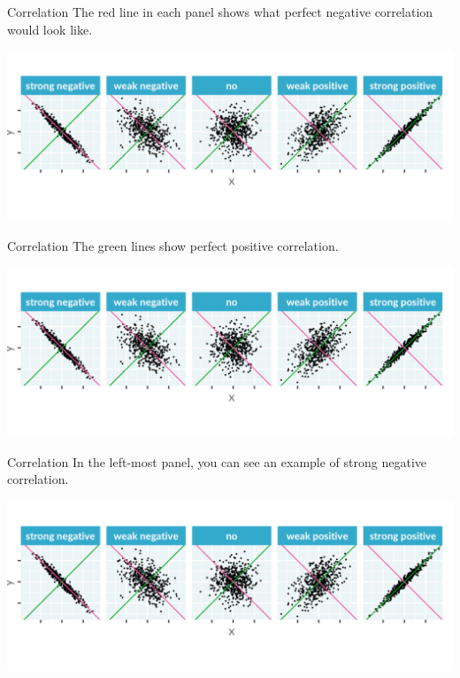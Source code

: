\documentclass[
  ignorenonframetext,
]{beamer}
\begin{document}
\begin{frame}{Correlation}
\label{correlation-4}
The red line in each panel shows what perfect negative correlation would
look like.

\includegraphics{../images/im34.png}
\end{frame}

\begin{frame}{Correlation}
\label{correlation-5}
The green lines show perfect positive correlation.

\includegraphics{../images/im34.png}
\end{frame}

\begin{frame}{Correlation}
\label{correlation-6}
In the left-most panel, you can see an example of strong negative
correlation.

\includegraphics{../images/im34.png}
\end{frame}
\end{document}
